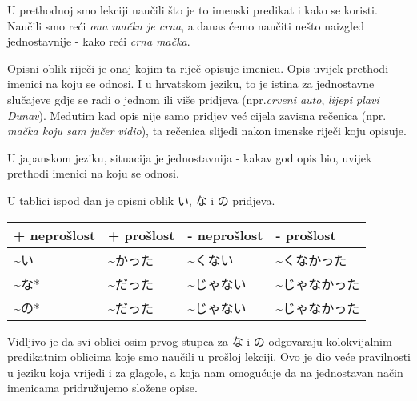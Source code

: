 
\author{Tomislav Mamić}

	
	U prethodnoj smo lekciji naučili što je to imenski predikat i kako se koristi. Naučili smo reći \textit{ona mačka je crna}, a danas ćemo naučiti nešto naizgled jednostavnije - kako reći \textit{crna mačka}.
	
	
	Opisni oblik riječi je onaj kojim ta riječ opisuje imenicu. Opis uvijek prethodi imenici na koju se odnosi. I u hrvatskom jeziku, to je istina za jednostavne slučajeve gdje se radi o jednom ili više pridjeva (npr.\textit{crveni auto}, \textit{lijepi plavi Dunav}). Međutim kad opis nije samo pridjev već cijela zavisna rečenica (npr. \textit{mačka koju sam jučer vidio}), ta rečenica slijedi nakon imenske riječi koju opisuje.
	
	U japanskom jeziku, situacija je jednostavnija - kakav god opis bio, uvijek prethodi imenici na koju se odnosi.
	
	U tablici ispod dan je opisni oblik い, な i の pridjeva.
	
	\begin{table}[h]
		\centering
		\begin{tabular}{l l l l}\toprule[2pt]
			+ neprošlost & + prošlost & - neprošlost & - prošlost\\
			\midrule
			\textasciitilde い & \textasciitilde かった & \textasciitilde くない & \textasciitilde くなかった\\
			\textasciitilde な* & \textasciitilde だった & \textasciitilde じゃない & \textasciitilde じゃなかった\\
			\textasciitilde の* & \textasciitilde だった & \textasciitilde じゃない & \textasciitilde じゃなかった\\
			\bottomrule[2pt]
		\end{tabular}
	\end{table}

	Vidljivo je da svi oblici osim prvog stupca za な i の odgovaraju kolokvijalnim predikatnim oblicima koje smo naučili u prošloj lekciji. Ovo je dio veće pravilnosti u jeziku koja vrijedi i za glagole, a koja nam omogućuje da na jednostavan način imenicama pridružujemo složene opise.
	
	
